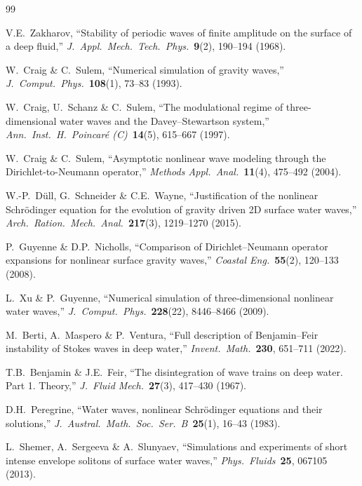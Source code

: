\documentclass[11pt]{article}
\begin{document}
\begin{thebibliography}{99}

V.E.\ Zakharov,
``Stability of periodic waves of finite amplitude on the surface of a deep fluid,''
\textit{J.\ Appl.\ Mech.\ Tech.\ Phys.}\ \textbf{9}(2), 190--194 (1968).

W.\ Craig \& C.\ Sulem,
``Numerical simulation of gravity waves,''
\textit{J.\ Comput.\ Phys.}\ \textbf{108}(1), 73--83 (1993).

W.\ Craig, U.\ Schanz \& C.\ Sulem,
``The modulational regime of three-dimensional water waves and the
Davey--Stewartson system,''
\textit{Ann.\ Inst.\ H.\ Poincar\'e (C)}\ \textbf{14}(5), 615--667 (1997).

W.\ Craig \& C.\ Sulem,
``Asymptotic nonlinear wave modeling through the Dirichlet-to-Neumann operator,''
\textit{Methods Appl.\ Anal.}\ \textbf{11}(4), 475--492 (2004).

W.-P.\ D\"ull, G.\ Schneider \& C.E.\ Wayne,
``Justification of the nonlinear Schr\"odinger equation for the evolution
of gravity driven 2D surface water waves,''
\textit{Arch.\ Ration.\ Mech.\ Anal.}\ \textbf{217}(3), 1219--1270 (2015).

P.\ Guyenne \& D.P.\ Nicholls,
``Comparison of Dirichlet--Neumann operator expansions for nonlinear
surface gravity waves,''
\textit{Coastal Eng.}\ \textbf{55}(2), 120--133 (2008).

L.\ Xu \& P.\ Guyenne,
``Numerical simulation of three-dimensional nonlinear water waves,''
\textit{J.\ Comput.\ Phys.}\ \textbf{228}(22), 8446--8466 (2009).

M.\ Berti, A.\ Maspero \& P.\ Ventura,
``Full description of Benjamin--Feir instability of Stokes waves in deep water,''
\textit{Invent.\ Math.}\ \textbf{230}, 651--711 (2022).

T.B.\ Benjamin \& J.E.\ Feir,
``The disintegration of wave trains on deep water. Part 1. Theory,''
\textit{J.\ Fluid Mech.}\ \textbf{27}(3), 417--430 (1967).

D.H.\ Peregrine,
``Water waves, nonlinear Schr\"odinger equations and their solutions,''
\textit{J.\ Austral.\ Math.\ Soc.\ Ser.\ B}\ \textbf{25}(1), 16--43 (1983).

L.\ Shemer, A.\ Sergeeva \& A.\ Slunyaev,
``Simulations and experiments of short intense envelope solitons of
surface water waves,''
\textit{Phys.\ Fluids}\ \textbf{25}, 067105 (2013).


\end{thebibliography}
\end{document}
